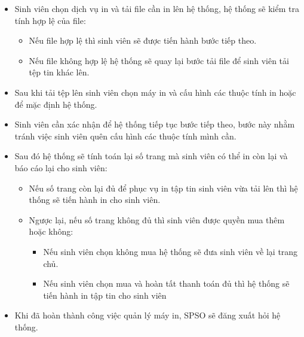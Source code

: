     \begin{itemize}
        \item Sinh viên chọn dịch vụ in và tải file cần in lên hệ thống, hệ thống sẽ kiểm tra tính hợp lệ của file:
        \begin{itemize}
            \item Nếu file hợp lệ thì sinh viên sẽ được tiến hành bước tiếp theo.
            \item Nếu file không hợp lệ hệ thống sẽ quay lại bước tải file để sinh viên tải tệp tin khác lên.
        \end{itemize}
        \item Sau khi tải tệp lên sinh viên chọn máy in và cấu hình các thuộc tính in hoặc để mặc định hệ thống.
        \item Sinh viên cần xác nhận để hệ thống tiếp tục bước tiếp theo, bước này nhằm tránh việc sinh viên quên cấu hình các thuộc tính mình cần.
        \item Sau đó hệ thống sẽ tính toán lại số trang mà sinh viên có thể in còn lại và báo cáo lại cho sinh viên:
        \begin{itemize}
            \item Nếu số trang còn lại đủ để phục vụ in tập tin sinh viên vừa tải lên thì hệ thống sẽ tiến hành in cho sinh viên.
            \item Ngược lại, nếu số trang không đủ thì sinh viên được quyền mua thêm hoặc không:
            \begin{itemize}
                \item Nếu sinh viên chọn không mua hệ thống sẽ đưa sinh viên về lại trang chủ.
                \item Nếu sinh viên chọn mua và hoàn tất thanh toán đủ thì hệ thống sẽ tiến hành in tập tin cho sinh viên
            \end{itemize}
        \end{itemize}
        \item Khi đã hoàn thành công việc quản lý máy in, SPSO sẽ đăng xuất hỏi hệ thống.
    \end{itemize}


    \newpage
